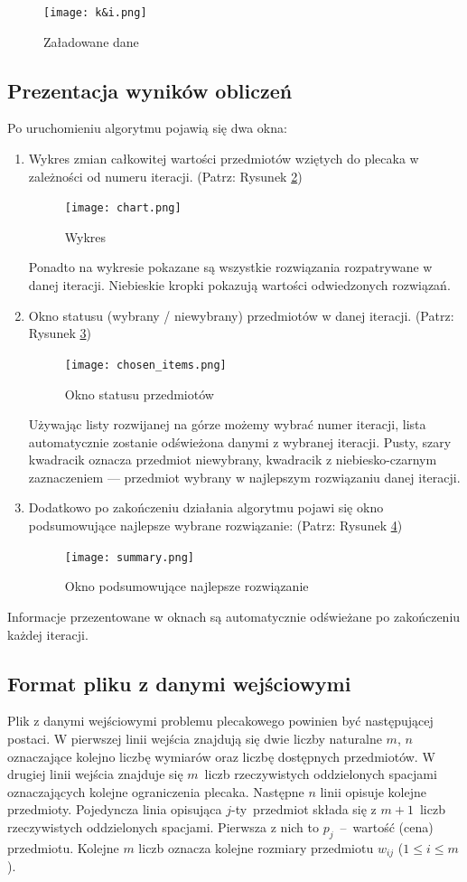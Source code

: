 \documentclass[a4paper,12pt,notitlepage]{mwrep}
\begin{document}
\begin{figure}[H]
\centering
\texttt{[image: k\&i.png]}
\caption{Załadowane dane}
\label{fig:ki}
\end{figure}

\subsection{Prezentacja wyników obliczeń}
Po uruchomieniu algorytmu pojawią się dwa okna:
\begin{enumerate}
	\item	Wykres zmian całkowitej wartości przedmiotów wziętych do plecaka
			w zależności od numeru iteracji. (Patrz: Rysunek \ref{fig:chart})\\
			\begin{figure}[h]
			\centering
			\texttt{[image: chart.png]}
			\caption{Wykres}
			\label{fig:chart}
			\end{figure}
			Ponadto na wykresie pokazane są wszystkie rozwiązania rozpatrywane w danej iteracji.
			Niebieskie kropki pokazują wartości odwiedzonych rozwiązań.
	\item	Okno statusu (wybrany / niewybrany) przedmiotów w danej iteracji. (Patrz: Rysunek \ref{fig:chosen_items})\\
			\begin{figure}[h]
			\centering
			\texttt{[image: chosen\_items.png]}
			\caption{Okno statusu przedmiotów}
			\label{fig:chosen_items}
			\end{figure}
			Używając listy rozwijanej na górze możemy wybrać numer iteracji,
			lista automatycznie zostanie odświeżona danymi z wybranej iteracji.
			Pusty, szary kwadracik oznacza przedmiot niewybrany, kwadracik z niebiesko-czarnym
			zaznaczeniem --- przedmiot wybrany w najlepszym rozwiązaniu danej iteracji.
	\item	Dodatkowo po zakończeniu działania algorytmu pojawi się okno podsumowujące najlepsze wybrane rozwiązanie:
			(Patrz: Rysunek \ref{fig:summary})
			\begin{figure}[H]
			\centering
			\texttt{[image: summary.png]}
			\caption{Okno podsumowujące najlepsze rozwiązanie}
			\label{fig:summary}
			\end{figure}
\end{enumerate}
Informacje przezentowane w oknach są automatycznie odświeżane po zakończeniu każdej iteracji.


\subsection{Format pliku z danymi wejściowymi} \label{format}
Plik z danymi wejściowymi problemu plecakowego powinien być następującej postaci. W pierwszej
linii wejścia znajdują się dwie liczby naturalne $m$, $n$ oznaczające kolejno liczbę wymiarów
oraz liczbę dostępnych przedmiotów. W drugiej linii wejścia znajduje się $m$~liczb rzeczywistych oddzielonych
spacjami oznaczających kolejne ograniczenia plecaka. Następne $n$ linii opisuje kolejne przedmioty.
Pojedyncza linia opisująca $j$-ty~przedmiot składa się z $m+1$~liczb rzeczywistych oddzielonych spacjami.
Pierwsza z nich to $p_j$~--~wartość (cena)
przedmiotu. Kolejne $m$ liczb oznacza kolejne rozmiary przedmiotu $w_{ij}$  ($1 \le i \le m$).
\end{document}
